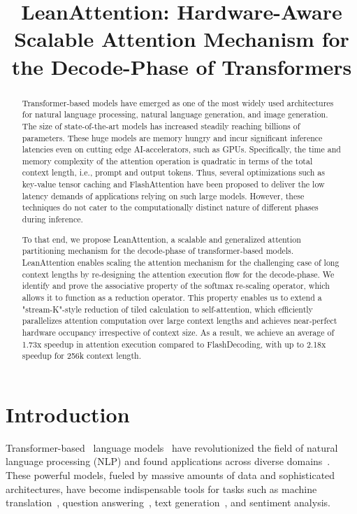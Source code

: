 \title{LeanAttention: Hardware-Aware Scalable Attention Mechanism for the Decode-Phase of Transformers}

\begin{abstract}
Transformer-based models have emerged as one of the most widely used architectures for natural language processing, natural language generation, and image generation. The size of state-of-the-art models has increased steadily reaching billions of parameters. These huge models are memory hungry and incur significant inference latencies even on cutting edge AI-accelerators, such as GPUs. Specifically, the time and memory complexity of the attention operation is quadratic in terms of the total context length, i.e., prompt and output tokens. Thus, several optimizations such as key-value tensor caching and FlashAttention have been proposed to deliver the low latency demands of applications relying on such large models. However, these techniques do not cater to the computationally distinct nature of different phases during inference.

To that end, we propose LeanAttention, a scalable and generalized attention partitioning mechanism for the decode-phase of transformer-based models. LeanAttention enables scaling the attention mechanism for the challenging case of long context lengths by re-designing the attention execution flow for the decode-phase. We identify and prove the associative property of the softmax re-scaling operator, which allows it to function as a reduction operator. This property enables us to extend a "stream-K"-style reduction of tiled calculation to self-attention, which efficiently parallelizes attention computation over large context lengths and achieves near-perfect hardware occupancy irrespective of context size. As a result, we achieve an average of 1.73x speedup in attention execution compared to FlashDecoding, with up to 2.18x speedup for 256k context length.
\end{abstract}

\section{Introduction}
\label{sec:introduction}

Transformer-based~\cite{vaswani2023attention} language models~\cite{openai2024gpt4, touvron2023llama, zhang2022opt, li2023textbooks, chowdhery2023palm} have revolutionized the field of natural language processing (NLP) and found applications across diverse domains~\cite{microsoftcopilot, googlebard}. These powerful models, fueled by massive amounts of data and sophisticated architectures, have become indispensable tools for tasks such as machine translation~\cite{devlin2019bert}, question answering~\cite{chatGPT}, text generation~\cite{chatGPT}, and sentiment analysis. 

